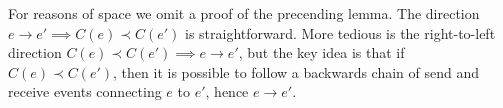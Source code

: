 \documentclass[]             %
{NASA}                       %
\theoremstyle{definition}
\begin{document}
For reasons of space we omit a proof of the precending lemma.  The
direction $e \to e' \implies C(e) \prec C(e')$ is
straightforward. More tedious is the right-to-left direction
$C(e) \prec C(e') \implies e \to e'$, but the key idea is that if
$C(e) \prec C(e')$, then it is possible to follow a backwards chain of
send and receive events connecting $e$ to $e'$, hence $e \to e'$.










\end{document}
